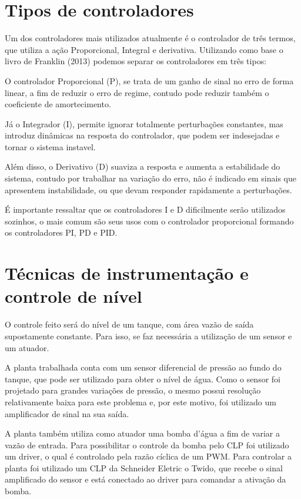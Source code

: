 \newpage

\section{Tipos de controladores}
\hspace{11mm} Um dos controladores mais utilizados atualmente é o controlador de três termos, que utiliza a ação Proporcional, Integral e derivativa. Utilizando como base o livro de Franklin (2013) podemos separar os controladores em três tipos:
	
O controlador Proporcional (P), se trata de um ganho de sinal no erro de forma linear, a fim de reduzir o erro de regime, contudo pode reduzir também o coeficiente de amortecimento.

Já o Integrador (I), permite ignorar totalmente perturbações constantes, mas introduz dinâmicas na resposta do controlador, que podem ser indesejadas e tornar o sistema instavel.

Além disso, o Derivativo (D)  suaviza a resposta e aumenta a estabilidade do sistema, contudo por trabalhar na variação do erro, não é indicado em sinais que apresentem instabilidade, ou que devam responder rapidamente a perturbações.

É importante ressaltar que os controladores I e D dificilmente serão utilizados sozinhos, o mais comum são seus usos com o controlador proporcional formando os controladores PI, PD e PID.

\section{Técnicas de instrumentação e controle de nível}

\hspace{11mm} O controle feito será do nível de um tanque, com área vazão de saída supostamente constante. Para isso, se faz necessária a utilização de um sensor e um atuador.

A planta trabalhada conta com um sensor diferencial de pressão ao fundo do tanque, que pode ser utilizado para obter o nível de água. Como o sensor foi projetado para grandes variações de pressão, o mesmo possui resolução relativamente baixa para este problema e, por este motivo, foi utilizado um amplificador de sinal na sua saída.

A planta também utiliza como atuador uma bomba d’água a fim de variar a vazão de entrada. Para possibilitar o controle da bomba pelo CLP foi utilizado um driver, o qual é controlado pela razão cíclica de um PWM. Para controlar a planta foi utilizado um CLP da Schneider Eletric o Twido, que recebe o sinal amplificado do sensor e está conectado ao driver para comandar a ativação da bomba.

